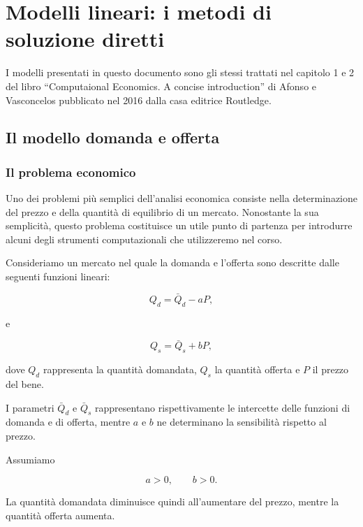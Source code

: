 
\chapter{Modelli lineari: i metodi di soluzione diretti}
\newpage
\minitoc
\newpage
I modelli presentati in questo documento sono gli stessi trattati nel capitolo 1 e 2 del libro ``Computaional Economics. A concise introduction'' di Afonso e Vasconcelos pubblicato nel 2016 dalla casa editrice Routledge.  

\section{\textbf{Il modello domanda e offerta}}\label{sec:domanda-offerta}

\subsection{Il problema economico}

Uno dei problemi più semplici dell'analisi economica consiste nella
determinazione del prezzo e della quantità di equilibrio di un mercato.
Nonostante la sua semplicità, questo problema costituisce un utile punto
di partenza per introdurre alcuni degli strumenti computazionali che
utilizzeremo nel corso.

Consideriamo un mercato nel quale la domanda e l'offerta sono descritte
dalle seguenti funzioni lineari:

\begin{equation}
    Q_d = \bar{Q}_d - aP,
    \label{eq:domanda}
\end{equation}

e

\begin{equation}
    Q_s = \bar{Q}_s + bP,
    \label{eq:offerta}
\end{equation}

dove $Q_d$ rappresenta la quantità domandata, $Q_s$ la quantità
offerta e $P$ il prezzo del bene.

I parametri $\bar{Q}_d$ e $\bar{Q}_s$ rappresentano rispettivamente
le intercette delle funzioni di domanda e di offerta, mentre $a$ e
$b$ ne determinano la sensibilità rispetto al prezzo.

Assumiamo

\begin{equation*}
    a > 0,
    \qquad
    b > 0.
\end{equation*}

La quantità domandata diminuisce quindi all'aumentare del prezzo,
mentre la quantità offerta aumenta.

